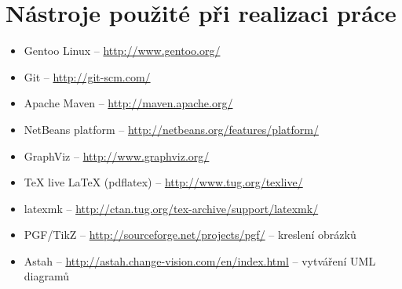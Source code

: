 \chapter{Nástroje použité při realizaci práce}
\noindent

\noindent

\begin{itemize}
\item Gentoo Linux -- \href{http://www.gentoo.org/}{http://www.gentoo.org/}
\item Git -- \href{http://git-scm.com/}{http://git-scm.com/}
\item Apache Maven -- \href{http://maven.apache.org/}{http://maven.apache.org/}
\item NetBeans platform -- \href{http://netbeans.org/features/platform/}{http://netbeans.org/features/platform/}
\item GraphViz -- \href{http://www.graphviz.org/}{http://www.graphviz.org/}
\item TeX live \LaTeX{} (pdflatex) -- \href{http://www.tug.org/texlive/}{http://www.tug.org/texlive/}
\item latexmk -- \href{http://ctan.tug.org/tex-archive/support/latexmk/}{http://ctan.tug.org/tex-archive/support/latexmk/}
\item PGF/TikZ -- \href{http://sourceforge.net/projects/pgf/}{http://sourceforge.net/projects/pgf/} -- kreslení obrázků
\item Astah -- \href{http://astah.change-vision.com/en/index.html}{http://astah.change-vision.com/en/index.html} -- vytváření UML diagramů
\end{itemize}
